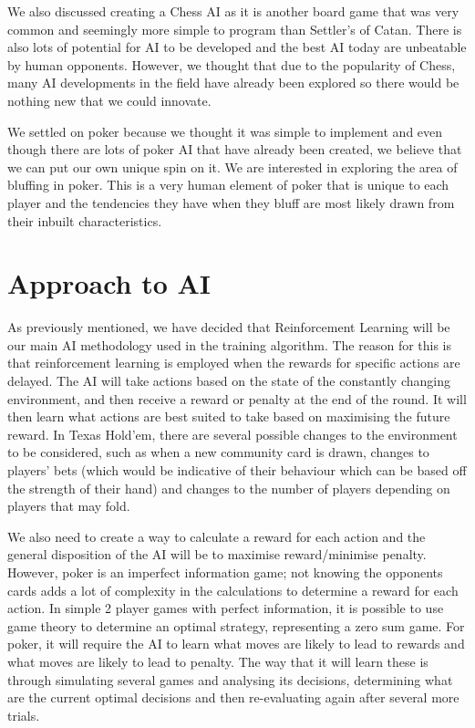\documentclass{article}
\begin{document}
\begin{multicols*}{2}
We also discussed creating a Chess AI as it is another board game that was very common and seemingly more simple to program than Settler's of Catan. There is also lots of potential for AI to be developed and the best AI today are unbeatable by human opponents. However, we thought that due to the popularity of Chess, many AI developments in the field have already been explored so there would be nothing new that we could innovate.
\newline

We settled on poker because we thought it was simple to implement and even though there are lots of poker AI that have already been created, we believe that we can put our own unique spin on it. We are interested in exploring the area of bluffing in poker. This is a very human element of poker that is unique to each player and the tendencies they have when they bluff are most likely drawn from their inbuilt characteristics.

\section{Approach to AI}
As previously mentioned, we have decided that Reinforcement Learning will be our main AI methodology used in the training algorithm. The reason for this is that reinforcement learning is employed when the rewards for specific actions are delayed. The AI will take actions based on the state of the constantly changing environment, and then receive a reward or penalty at the end of the round. It will then learn what actions are best suited to take based on maximising the future reward. In Texas Hold'em, there are several possible changes to the environment to be considered, such as when a new community card is drawn, changes to players' bets (which would be indicative of their behaviour which can be based off the strength of their hand) and changes to the number of players depending on players that may fold.
\newline

We also need to create a way to calculate a reward for each action and the general disposition of the AI will be to maximise reward/minimise penalty. However, poker is an imperfect information game; not knowing the opponents cards adds a lot of complexity in the calculations to determine a reward for each action. In simple 2 player games with perfect information, it is possible to use game theory to determine an optimal strategy, representing a zero sum game. For poker, it will require the AI to learn what moves are likely to lead to rewards and what moves are likely to lead to penalty. The way that it will learn these is through simulating several games and analysing its decisions, determining what are the current optimal decisions and then re-evaluating again after several more trials.
\newline


\end{multicols*}
\end{document}
